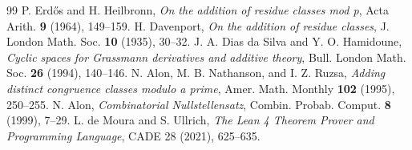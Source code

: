 \documentclass[11pt,a4paper]{article}
\theoremstyle{definition}
\begin{document}
\begin{thebibliography}{99}
 P. Erd\H{o}s and H. Heilbronn, \textit{On the addition of residue classes mod p}, Acta Arith. \textbf{9} (1964), 149--159.
 H. Davenport, \textit{On the addition of residue classes}, J. London Math. Soc. \textbf{10} (1935), 30--32.
 J. A. Dias da Silva and Y. O. Hamidoune, \textit{Cyclic spaces for Grassmann derivatives and additive theory}, Bull. London Math. Soc. \textbf{26} (1994), 140--146.
 N. Alon, M. B. Nathanson, and I. Z. Ruzsa, \textit{Adding distinct congruence classes modulo a prime}, Amer. Math. Monthly \textbf{102} (1995), 250--255.
 N. Alon, \textit{Combinatorial Nullstellensatz}, Combin. Probab. Comput. \textbf{8} (1999), 7--29.
 L. de Moura and S. Ullrich, \textit{The Lean 4 Theorem Prover and Programming Language}, CADE 28 (2021), 625--635.
\end{thebibliography}
\end{document}

